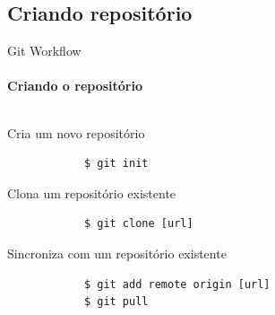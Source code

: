 \documentclass[xcolor=dvipsnames,t]{beamer}
\begin{document}
\subsection{Criando repositório}
\begin{frame}[fragile]{Git Workflow}
\framesubtitle{Criando o repositório}

\begin{columns}[t]
	
	\begin{column}{.7\textwidth}
		\vspace{0.1 cm}
		\begin{block}{Cria um novo repositório}		
			\begin{verbatim}
			$ git init
			\end{verbatim}
		\end{block}		
		\vspace{0.5 cm}
		\begin{alertblock}{Clona um repositório existente}		
			\begin{verbatim}
			$ git clone [url]
			\end{verbatim}
		\end{alertblock}
		\vspace{0.4 cm}
		\begin{alertblock}{Sincroniza com um repositório existente}		
			\begin{verbatim}
			$ git add remote origin [url]
			$ git pull 
			\end{verbatim}
		\end{alertblock}
		
	\end{column}


\end{columns}
\end{frame}
\end{document}
